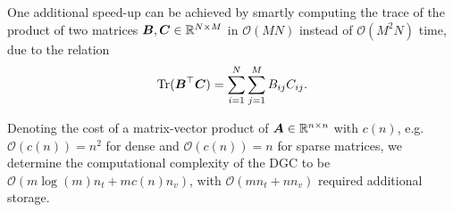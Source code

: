 One additional speed-up can be achieved by smartly computing the trace of the 
product of two matrices $\boldsymbol{B}, \boldsymbol{C} \in \mathbb{R}^{N \times M}$ in
$\mathcal{O}(MN)$ instead of $\mathcal{O}(M^2N)$ time, due to the relation
\begin{equation}
    \operatorname{Tr}(\boldsymbol{B}^{\top}\boldsymbol{C}) = \sum_{i=1}^{N} \sum_{j=1}^{M} B_{ij} C_{ij}.
    \label{equ:2-chebyshev-fast-trace}
\end{equation}

Denoting the cost of a matrix-vector product of $\boldsymbol{A} \in \mathbb{R}^{n \times n}$
with $c(n)$, e.g. $\mathcal{O}(c(n)) = n^2$ for dense and
$\mathcal{O}(c(n)) = n$ for sparse matrices, we determine the computational
complexity of the \gls{DGC} to be $\mathcal{O}(m \log(m) n_t + m c(n) n_v)$,
with $\mathcal{O}(m n_t + n n_v)$ required additional storage.
